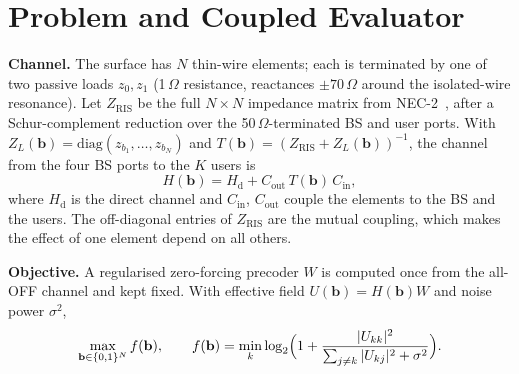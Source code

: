 \documentclass[runningheads]{llncs}
\newcommand{\Hd}{H_{\mathrm{d}}}
\begin{document}
\section{Problem and Coupled Evaluator}\label{sec:problem}
\textbf{Channel.} The surface has $N$ thin-wire elements; each is terminated by one of two passive loads $z_0,z_1$ (1\,$\Omega$ resistance, reactances $\pm70\,\Omega$ around the isolated-wire resonance). Let $Z_{\mathrm{RIS}}$ be the full $N\times N$ impedance matrix from NEC-2~\cite{burke1981nec,pynec}, after a Schur-complement reduction over the 50\,$\Omega$-terminated BS and user ports. With $Z_L(\mathbf b)=\mathrm{diag}(z_{b_1},\dots,z_{b_N})$ and $T(\mathbf b)=(Z_{\mathrm{RIS}}+Z_L(\mathbf b))^{-1}$, the channel from the four BS ports to the $K$ users is
\begin{equation}
H(\mathbf b)=\Hd + C_{\mathrm{out}}\,T(\mathbf b)\,C_{\mathrm{in}},
\label{eq:operator}
\end{equation}
where $\Hd$ is the direct channel and $C_{\mathrm{in}}$, $C_{\mathrm{out}}$ couple the elements to the BS and the users. The off-diagonal entries of $Z_{\mathrm{RIS}}$ are the mutual coupling, which makes the effect of one element depend on all others.

\textbf{Objective.} A regularised zero-forcing precoder $W$ is computed once from the all-OFF channel and kept fixed. With effective field $U(\mathbf b)=H(\mathbf b)W$ and noise power $\sigma^2$,
\begin{equation}
\max_{\mathbf b\in\{0,1\}^N} f(\mathbf b),\qquad f(\mathbf b)=\min_{k}\log_2\Bigl(1+\frac{|U_{kk}|^2}{\sum_{j\ne k}|U_{kj}|^2+\sigma^2}\Bigr).
\label{eq:objective}
\end{equation}
\end{document}
